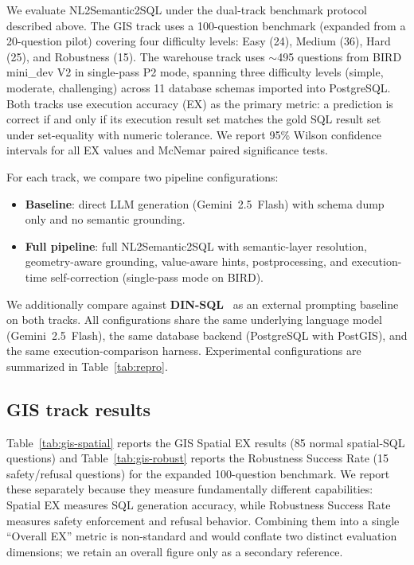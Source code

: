 \documentclass[11pt]{article}
\begin{document}
We evaluate NL2Semantic2SQL under the dual-track benchmark protocol described above. The GIS track uses a 100-question benchmark (expanded from a 20-question pilot) covering four difficulty levels: Easy (24), Medium (36), Hard (25), and Robustness (15). The warehouse track uses $\sim$495 questions from BIRD mini\_dev V2 in single-pass P2 mode, spanning three difficulty levels (simple, moderate, challenging) across 11 database schemas imported into PostgreSQL. Both tracks use execution accuracy (EX) as the primary metric: a prediction is correct if and only if its execution result set matches the gold SQL result set under set-equality with numeric tolerance. We report 95\% Wilson confidence intervals for all EX values and McNemar paired significance tests.

For each track, we compare two pipeline configurations:
\begin{itemize}[leftmargin=*]
  \item \textbf{Baseline}: direct LLM generation (Gemini~2.5~Flash) with schema dump only and no semantic grounding.
  \item \textbf{Full pipeline}: full NL2Semantic2SQL with semantic-layer resolution, geometry-aware grounding, value-aware hints, postprocessing, and execution-time self-correction (single-pass mode on BIRD).
\end{itemize}

We additionally compare against \textbf{DIN-SQL}~\cite{pourreza2023dinsql} as an external prompting baseline on both tracks. All configurations share the same underlying language model (Gemini~2.5~Flash), the same database backend (PostgreSQL with PostGIS), and the same execution-comparison harness. Experimental configurations are summarized in Table~\ref{tab:repro}.

\subsection{GIS track results}
\label{sec:gis-results}

Table~\ref{tab:gis-spatial} reports the GIS Spatial EX results (85 normal spatial-SQL questions) and Table~\ref{tab:gis-robust} reports the Robustness Success Rate (15 safety/refusal questions) for the expanded 100-question benchmark. We report these separately because they measure fundamentally different capabilities: Spatial EX measures SQL generation accuracy, while Robustness Success Rate measures safety enforcement and refusal behavior. Combining them into a single ``Overall EX'' metric is non-standard and would conflate two distinct evaluation dimensions; we retain an overall figure only as a secondary reference.
\end{document}
